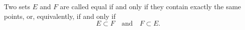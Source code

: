 Two sets $E$ and $F$ are called equal if and only if they contain exactly the same points, or, equivalently, if and only if
$$E \subset F \quad \text{and} \quad F \subset E.$$
